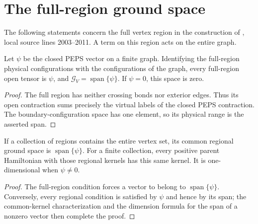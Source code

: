 \section{The full-region ground space}%
\label{sec:peps_full_region_ground_space}

The following statements concern the full vertex region in the construction
of \cite[Section~IV.C.1]{Cirac2021Matrix}, local source lines 2003--2011.
A term on this region acts on the entire graph.

\begin{lemma}%
    \label{thm:peps_full_region_range}
    \leanok
    Let $\psi$ be the closed PEPS vector on a finite graph.
    Identifying the full-region physical configurations with the
    configurations of the graph, every full-region open tensor is
    $\psi$, and $\mathcal G_V=\operatorname{span}\{\psi\}$.
    If $\psi=0$, this space is zero.
\end{lemma}

\begin{proof}\leanok
    The full region has neither crossing bonds nor exterior edges.
    Thus its open contraction sums precisely the virtual labels
    of the closed PEPS contraction. The boundary-configuration
    space has one element, so its physical range is the asserted span.
\end{proof}

\begin{lemma}%
    \label{thm:peps_parent_full_region_span}
    \leanok
    If a collection of regions contains the entire vertex set,
    its common regional ground space is $\operatorname{span}\{\psi\}$.
    For a finite collection, every positive parent Hamiltonian
    with those regional kernels has this same kernel.
    It is one-dimensional when $\psi\ne0$.
\end{lemma}

\begin{proof}\leanok
    The full-region condition forces a vector to belong to
    $\operatorname{span}\{\psi\}$. Conversely, every regional
    condition is satisfied by $\psi$ and hence by its span;
    the common-kernel characterization and the dimension
    formula for the span of a nonzero vector then complete the proof.
\end{proof}

